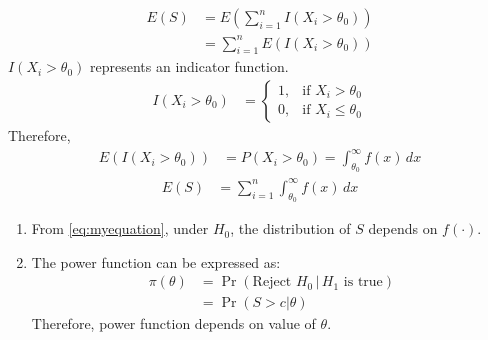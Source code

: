 \documentclass[journal,12pt,onecolumn]{IEEEtran}
\theoremstyle{remark}
\begin{document}
\begin{align}
E(S) &= E\left(\sum_{i=1}^{n} I(X_i > \theta_0)\right)\\
     &=\sum_{i=1}^{n} E(I(X_i > \theta_0))
\end{align}
$I(X_i > \theta_0)$ represents an indicator function.
\begin{align}
 I(X_i > \theta_0) &=
 \begin{cases}
 1, & \text{if } X_i > \theta_0 \\
 0, & \text{if } X_i \leq \theta_0
 \end{cases}
\end{align}
Therefore,
\begin{align}
 E(I(X_i > \theta_0)) &= P(X_i > \theta_0) = \int_{\theta_0}^{\infty} f(x) \, dx
\end{align}
\begin{align}\label{eq:myequation}
E(S) &= \sum_{i=1}^{n} \int_{\theta_0}^{\infty} f(x) \, dx
\end{align}
\begin{enumerate}
\item From \eqref{eq:myequation}, under $H_0$, the distribution of $S$ depends on $f(\cdot)$.\\
\item The power function can be expressed as:
\begin{align}
\pi(\theta) &= \Pr(\text{Reject } H_0 \, | \, H_1 \text{ is true})\\
&= \Pr(S > c | \theta)
\end{align}
Therefore, power function depends on value of $\theta$.
\end{enumerate}
\end{document}
